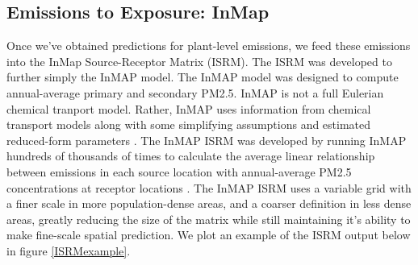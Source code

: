 \documentclass[a4paper]{article}
\theoremstyle{definition}
\theoremstyle{plain}
\begin{document}
\subsection{Emissions to Exposure: InMap}
Once we've obtained predictions for plant-level emissions, we feed these emissions into the InMap Source-Receptor Matrix (ISRM).  The ISRM was developed to further simply the InMAP model.  The InMAP model was designed to compute annual-average primary and secondary PM2.5.  InMAP is not a full Eulerian chemical tranport model. Rather, InMAP uses information from chemical transport models along with some simplifying assumptions and estimated reduced-form parameters \citep{Tessum2017InMAP:Interventions}.  The InMAP ISRM was developed by running InMAP hundreds of thousands of times to calculate the average linear relationship between emissions in each source location with annual-average PM2.5 concentrations at receptor locations \citep{Goodkind2019Fine-scaleEmissions}.  The InMAP ISRM uses a variable grid with a finer scale in more population-dense areas, and a coarser definition in less dense areas, greatly reducing the size of the matrix while still maintaining it's ability to make fine-scale spatial prediction.  We plot an example of the ISRM output below in figure \ref{ISRMexample}.
\end{document}
